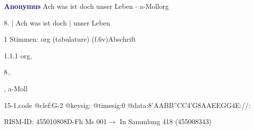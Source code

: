 \documentclass[twocolumn]{book}
\begin{document}
\par \vspace{7pt} \textcolor{darkblue}{\textbf{Anonymus  }}\hfillplus{\textbf{[15]}}\newline Ach was ist doch unser Leben - a-Moll\newline org
\par \begin{itshape}[f.6v, at left:] 8. | Ach was ist doch | unser Leben\end{itshape} 
\par \textcolor{darkblue}{}  1 Stimmen: org (tabulature)  (f.6v)\newline Abschrift
\par 1.1.1  org, \begin{itshape}8..\end{itshape}, a-Moll  
\begin{filecontents*}{15-1.code}
@clef:G-2
@keysig:
@timesig:0
@data:{8'AABB}{''CC}4'G{8AAEE}{GG}4E://:
\end{filecontents*}
\newline
%
\par RISM-ID: 455010808\newline D-Fh  Ms 001\newline $\rightarrow$ In Sammlung 418 (455008343)
      
\end{document}
